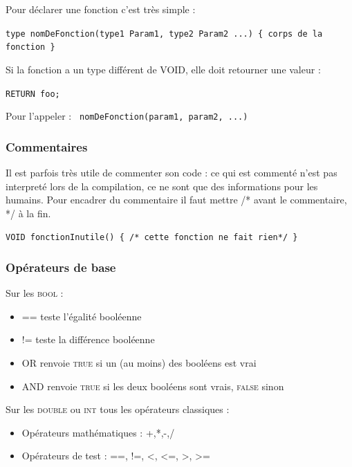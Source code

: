 \documentclass[a4paper,11pt]{article}
\begin{document}
            Pour déclarer une fonction c'est très simple : 
            \begin{center}
                \texttt{type nomDeFonction(type1 Param1, type2 Param2 ...) \{ corps de la fonction \}}
            \end{center}

            Si la fonction a un type différent de VOID, elle doit retourner une valeur : 
            \begin{center}
                \texttt{RETURN foo;}
            \end{center}

            Pour l'appeler : \texttt{ nomDeFonction(param1, param2, ...)}

        \subsubsection{Commentaires}
            Il est parfois très utile de commenter son code : ce qui est commenté n'est pas interpreté lors de la compilation, ce ne sont que des informations pour les humains.
            Pour encadrer du commentaire il faut mettre /* avant le commentaire, */ à la fin.
            \begin{center}
                \texttt{VOID fonctionInutile() \{ /* cette fonction ne fait rien*/ \}}
            \end{center}

        \subsubsection{Opérateurs de base}
            Sur les \textsc{bool} : 
            \begin{itemize}
                \item == teste l'égalité booléenne
                \item != teste la différence booléenne 
                \item OR renvoie \textsc{true} si un (au moins) des booléens est vrai
                \item AND renvoie \textsc{true} si les deux booléens sont vrais, \textsc{false} sinon
            \end{itemize}

            Sur les \textsc{double} ou \textsc{int} tous les opérateurs classiques :
            \begin{itemize}
                \item Opérateurs mathématiques : +,*,-,/
                \item Opérateurs de test : ==, !=, <, <=, >, >=
            \end{itemize}
\end{document}
